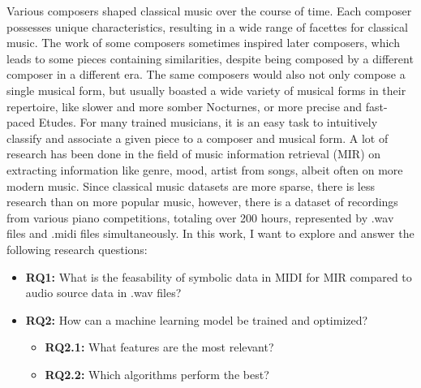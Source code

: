 \documentclass[../../sections/introduction.tex]{subfiles}
\begin{document}
    Various composers shaped classical music over the course of time.
    Each composer possesses unique characteristics, resulting in a wide
    range of facettes for classical music. The work of some composers
    sometimes inspired later composers, which leads to some pieces
    containing similarities, despite being composed by a different
    composer in a different era. The same composers would also not only
    compose a single musical form, but usually boasted a wide variety of
    musical forms in their repertoire, like slower and more somber
    Nocturnes, or more precise and fast-paced Etudes. For many trained
    musicians, it is an easy task to intuitively classify and associate a
    given piece to a composer and musical form. A lot of research has
    been done in the field of music information retrieval (MIR) on
    extracting information like genre, mood, artist from songs, albeit
    often on more modern music. Since classical music datasets are more
    sparse, there is less research than on more popular music, however,
    there is a dataset of recordings from various piano competitions,
    totaling over 200 hours, represented by .wav files and .midi files
    simultaneously. In this work, I want to explore and answer the
    following research questions:

    \begin{itemize}

      \item \textbf{RQ1:} What is the feasability of symbolic data in
        MIDI for MIR compared to audio source data in .wav files?

      \item \textbf{RQ2:} How can a machine learning model be trained and
        optimized?

        \begin{itemize}

          \item \textbf{RQ2.1:} What features are the most relevant?

          \item \textbf{RQ2.2:} Which algorithms perform the best?
          
        \end{itemize}
      
    \end{itemize}
\end{document}
